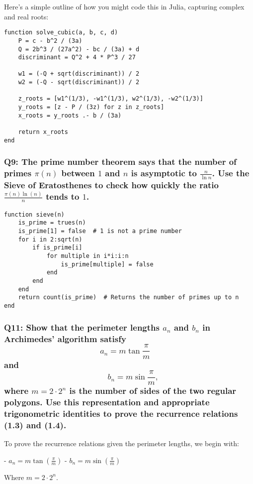 \documentclass{article}
\begin{document}
Here’s a simple outline of how you might code this in Julia, capturing complex and real roots:

\begin{verbatim}
function solve_cubic(a, b, c, d)
    P = c - b^2 / (3a)
    Q = 2b^3 / (27a^2) - bc / (3a) + d
    discriminant = Q^2 + 4 * P^3 / 27

    w1 = (-Q + sqrt(discriminant)) / 2
    w2 = (-Q - sqrt(discriminant)) / 2

    z_roots = [w1^(1/3), -w1^(1/3), w2^(1/3), -w2^(1/3)]
    y_roots = [z - P / (3z) for z in z_roots]
    x_roots = y_roots .- b / (3a)

    return x_roots
end
\end{verbatim}

\subsubsection*{Q9: The prime number theorem says that the number of primes $\pi(n)$ between $1$ and $n$ is asymptotic to $\frac{n}{\ln n}$. Use the Sieve of Eratosthenes to check how quickly the ratio $\frac{\pi(n) \ln(n)}{n}$ tends to $1$.}

\begin{verbatim}
function sieve(n)
    is_prime = trues(n)
    is_prime[1] = false  # 1 is not a prime number
    for i in 2:sqrt(n)
        if is_prime[i]
            for multiple in i*i:i:n
                is_prime[multiple] = false
            end
        end
    end
    return count(is_prime)  # Returns the number of primes up to n
end
\end{verbatim}

\subsubsection*{Q11: Show that the perimeter lengths $a_n$ and $b_n$ in Archimedes’ algorithm satisfy
\[ a_n = m \tan \frac{\pi}{m} \quad\] and\[\quad b_n = m \sin \frac{\pi}{m}, \]
where \( m = 2 \cdot 2^n \) is the number of sides of the two regular polygons. Use this representation and appropriate trigonometric identities to prove the recurrence relations (1.3) and (1.4).}

To prove the recurrence relations given the perimeter lengths, we begin with:

- \( a_n = m \tan \left( \frac{\pi}{m} \right) \)
- \( b_n = m \sin \left( \frac{\pi}{m} \right) \)

Where \( m = 2 \cdot 2^n \).
\end{document}
